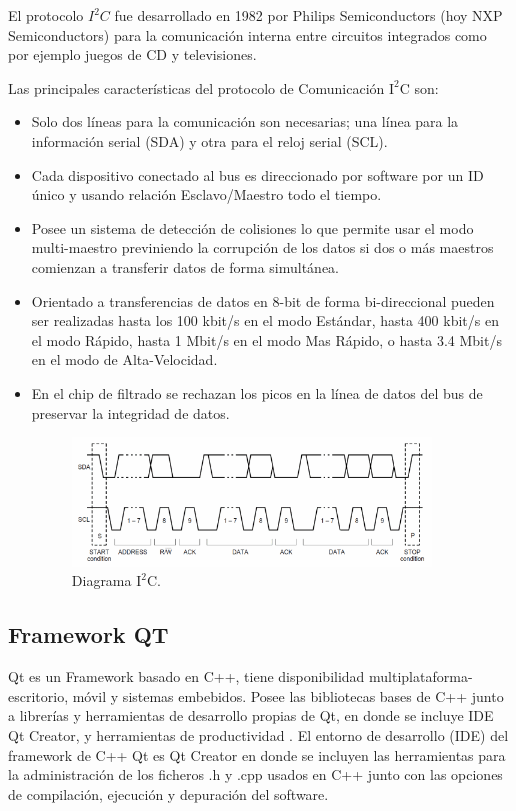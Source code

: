 \documentclass[12pt,a4paper]{article}
\begin{document}
El protocolo $I^2C$ fue desarrollado en 1982 por Philips Semiconductors (hoy NXP Semiconductors) para la comunicación interna entre circuitos integrados como por ejemplo juegos de CD y televisiones.

Las principales características del protocolo de Comunicación $\mathrm{I^2C}$ \cite{I2C} son:
\begin{itemize}
	\item Solo dos líneas para la comunicación son necesarias; una línea para la información serial (SDA) y otra para el reloj serial (SCL).
	
	\item Cada dispositivo conectado al bus es direccionado por software por un ID único y usando relación Esclavo/Maestro todo el tiempo.
	
	\item Posee un sistema de detección de colisiones lo que permite usar el modo multi-maestro previniendo la corrupción de los datos si dos o más maestros comienzan a transferir datos de forma simultánea.
	
	\item Orientado a transferencias de datos en 8-bit de forma bi-direccional pueden ser realizadas hasta los 100 kbit/s en el modo Estándar, hasta 400 kbit/s en el modo Rápido, hasta 1 Mbit/s en el modo Mas Rápido, o hasta 3.4 Mbit/s en el modo de Alta-Velocidad.
	
	\item En el chip de filtrado se rechazan los picos en la línea de datos del bus de preservar la integridad de datos.
	
	\begin{figure}[H]
		\centering
		\includegraphics[width=0.9\textwidth]{images/Diagrama_I2C}
		\caption{Diagrama $\mathrm{I^2C.}$}
		\label{fig:diagramaI2C}
	\end{figure}
\end{itemize}


\subsection{Framework QT}
Qt\cite{QT} es un Framework basado en C++, tiene disponibilidad multiplataforma- escritorio, móvil y sistemas embebidos.
Posee las bibliotecas bases de C++  junto a librerías y herramientas de desarrollo propias de Qt, en donde se incluye IDE Qt Creator, y herramientas de productividad .
El entorno de desarrollo (IDE) del framework de C++ Qt  es Qt Creator en donde se incluyen las herramientas para la administración de los ficheros .h y .cpp usados en C++ junto con las opciones de compilación, ejecución y depuración del software.
\end{document}
